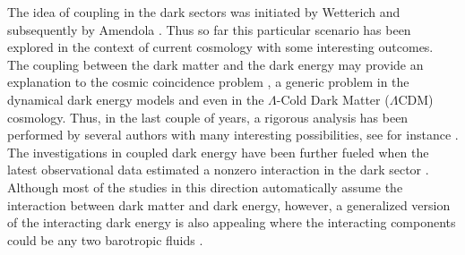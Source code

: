 \documentclass[superscriptaddress,oneolumn,secnumarabic,
amssymb,amsmath,nobibnotes,aps,prd,showpacs,nofootinbib]{revtex4}%
\begin{document}
The idea of coupling in the dark sectors was initiated by Wetterich \cite{Wetterich:1994bg} and subsequently by Amendola \cite{Amendola:1999er}. Thus so far this particular scenario has been explored in the context of current cosmology with some interesting outcomes. The coupling between the dark matter and the dark energy may provide an explanation to the cosmic coincidence problem \cite{Zlatev:1998tr}, a generic problem in the dynamical dark energy models and even in the $\Lambda$-Cold Dark Matter ($\Lambda$CDM) cosmology. Thus, in the last couple of years, a rigorous analysis has been performed by several authors with many interesting possibilities, see for instance \cite{Billyard:2000bh, Olivares:2005tb,delCampo:2008jx,Amendola, Koivisto, delCampo:2008sr,Chimento:2009hj, Quartin:2008px, Valiviita:2009nu, Clemson:2011an, Pan:2013rha, Yang:2014hea, Faraoni:2014vra, Yang:2014gza, Nunes:2014qoa, yang:2014vza,thor,barrow, amendola, llinares, Pan:2014afa, Chen:2011cy, Tamanini:2015iia, Pan:2012ki, Duniya:2015nva, Valiviita:2015dfa, Yang:2016evp, Pan:2016ngu, Mukherjee:2016shl, Sola:2016ecz, Sharov:2017iue, Cai:2017yww, Santos:2017bqm, Mifsud:2017fsy}. The investigations in coupled dark energy have been further fueled  when the latest observational data estimated a nonzero interaction in the dark sector \cite{Salvatelli:2014zta, Nunes:2016dlj,Kumar:2016zpg, vandeBruck:2016hpz, Yang:2017yme, Kumar:2017dnp}. Although most of the studies in this direction automatically assume the interaction between dark matter and dark energy, however, a generalized version of the interacting dark energy is also appealing where the interacting components could be any two barotropic fluids \cite{Barrow:2006hia}.
\end{document}
